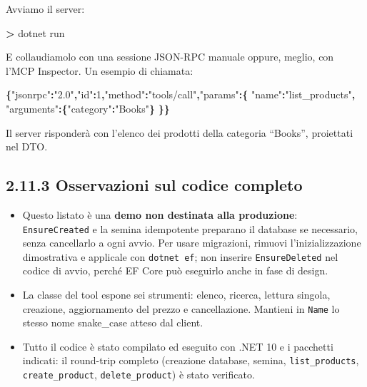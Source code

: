 \documentclass[
  italian,
  10pt,
]{book}
\newenvironment{Shaded}{\begin{snugshade}}{\end{snugshade}}
\newcommand{\DataTypeTok}[1]{\textcolor[rgb]{0.13,0.29,0.53}{#1}}
\newcommand{\DecValTok}[1]{\textcolor[rgb]{0.00,0.00,0.81}{#1}}
\newcommand{\ExtensionTok}[1]{#1}
\newcommand{\FunctionTok}[1]{\textcolor[rgb]{0.13,0.29,0.53}{\textbf{#1}}}
\newcommand{\NormalTok}[1]{#1}
\newcommand{\OperatorTok}[1]{\textcolor[rgb]{0.81,0.36,0.00}{\textbf{#1}}}
\newcommand{\StringTok}[1]{\textcolor[rgb]{0.31,0.60,0.02}{#1}}
\providecommand{\tightlist}{%
  \setlength{\itemsep}{0pt}\setlength{\parskip}{0pt}}
\begin{document}
Avviamo il server:

\begin{Shaded}
\begin{Highlighting}[]
\OperatorTok{\textgreater{}}\NormalTok{ dotnet }\ExtensionTok{run}
\end{Highlighting}
\end{Shaded}

E collaudiamolo con una sessione JSON-RPC manuale oppure, meglio, con
l'MCP Inspector. Un esempio di chiamata:

\begin{Shaded}
\begin{Highlighting}[]
\FunctionTok{\{}\DataTypeTok{"jsonrpc"}\FunctionTok{:}\StringTok{"2.0"}\FunctionTok{,}\DataTypeTok{"id"}\FunctionTok{:}\DecValTok{1}\FunctionTok{,}\DataTypeTok{"method"}\FunctionTok{:}\StringTok{"tools/call"}\FunctionTok{,}\DataTypeTok{"params"}\FunctionTok{:\{}
  \DataTypeTok{"name"}\FunctionTok{:}\StringTok{"list\_products"}\FunctionTok{,}
  \DataTypeTok{"arguments"}\FunctionTok{:\{}\DataTypeTok{"category"}\FunctionTok{:}\StringTok{"Books"}\FunctionTok{\}}
\FunctionTok{\}\}}
\end{Highlighting}
\end{Shaded}

Il server risponderà con l'elenco dei prodotti della categoria
``Books'', proiettati nel DTO.

\subsection{2.11.3 Osservazioni sul codice
completo}\label{osservazioni-sul-codice-completo}

\begin{itemize}
\tightlist
\item
  Questo listato è una \textbf{demo non destinata alla produzione}:
  \texttt{EnsureCreated} e la semina idempotente preparano il database
  se necessario, senza cancellarlo a ogni avvio. Per usare migrazioni,
  rimuovi l'inizializzazione dimostrativa e applicale con
  \texttt{dotnet\ ef}; non inserire \texttt{EnsureDeleted} nel codice di
  avvio, perché EF Core può eseguirlo anche in fase di design.
\item
  La classe del tool espone sei strumenti: elenco, ricerca, lettura
  singola, creazione, aggiornamento del prezzo e cancellazione. Mantieni
  in \texttt{Name} lo stesso nome snake\_case atteso dal client.
\item
  Tutto il codice è stato compilato ed eseguito con .NET 10 e i
  pacchetti indicati: il round-trip completo (creazione database,
  semina, \texttt{list\_products}, \texttt{create\_product},
  \texttt{delete\_product}) è stato verificato.
\end{itemize}
\end{document}
